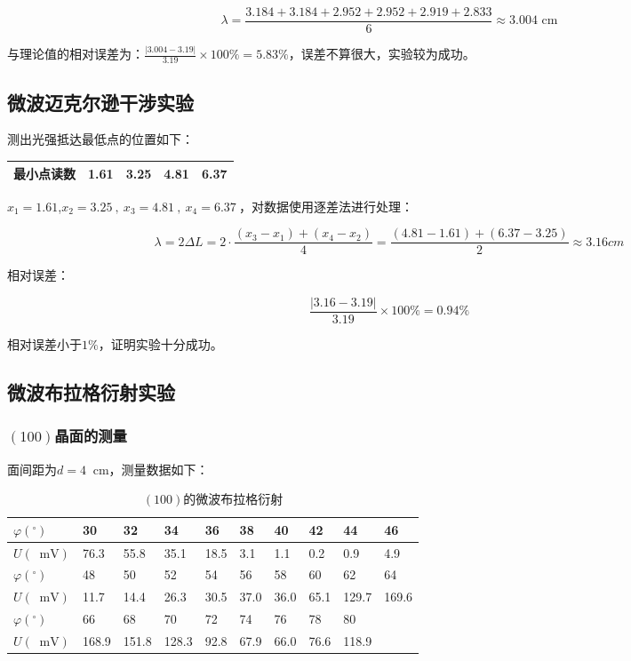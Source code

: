 \documentclass[11pt]{article}
\newcommand*{\unit}[1]{\mathop{}\!\mathrm{#1}}
\begin{document}
\[\lambda = \frac{3.184+3.184+2.952+2.952+2.919+2.833}{6}\approx 3.004 \text{ cm}\]

与理论值的相对误差为：$\frac{|3.004 - 3.19|}{3.19} \times 100\% = 5.83\%$，误差不算很大，实验较为成功。

\subsection{微波迈克尔逊干涉实验}

测出光强抵达最低点的位置如下：

\begin{table}[H]
  \centering
	\begin{tabular}{|l|l|l|l|l|}
		\hline
		最小点读数 & 1.61 & 3.25 & 4.81 & 6.37 \\ \hline
	\end{tabular}
\end{table}

$x_1=1.61$,$ x_2=3.25\ ,\ x_3=4.81\ ,\ x_4=6.37\ $，对数据使用逐差法进行处理：

\[\lambda = 2\Delta L = 2\cdot\frac{(x_3-x_1)+(x_4-x_2)}{4} = \frac{(4.81-1.61)+(6.37-3.25)}{2} \approx 3.16  cm\]

相对误差：

\[\frac{|3.16-3.19|}{3.19}\times100\%=0.94\%\]

相对误差小于$1\%$，证明实验十分成功。

\subsection{微波布拉格衍射实验}

\subsubsection{$(100)$晶面的测量}

面间距为$ d = 4\unit{cm} $，测量数据如下：

\begin{table}[H]
	\centering
	\begin{tabular}{|l|l|l|l|l|l|l|l|l|l|}
		\hline
    $\varphi(^\circ)$ & 30   & 32  & 34   & 36  & 38  & 40   & 42   & 44   & 46   \\ \hline
		$U(\unit{mV})$ & 76.3  & 55.8  & 35.1  & 18.5  & 3.1   & 1.1   & 0.2   & 0.9   & 4.9   \\ \hline
		$\varphi(^\circ)$ & 48   & 50  & 52   & 54  & 56  & 58   & 60   & 62   & 64   \\ \hline
		$U(\unit{mV})$ &11.7  & 14.4  & 26.3  & 30.5  & 37.0  & 36.0  & 65.1  & 129.7  & 169.6   \\ \hline
		$\varphi(^\circ)$ & 66   & 68  & 70   & 72  & 74  & 76   & 78   & 80   &      \\ \hline
		$U(\unit{mV})$ &168.9  & 151.8  & 128.3  & 92.8  & 67.9  & 66.0  & 76.6  & 118.9  &  \\ \hline
	\end{tabular}
	  \caption{$(100)$的微波布拉格衍射}
\end{table}
\end{document}
